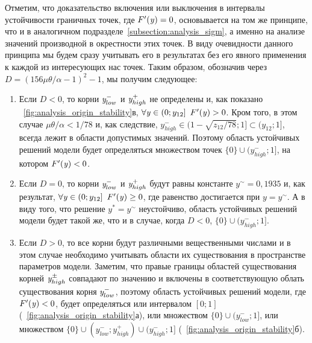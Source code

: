 Отметим, что доказательство включения или выключения в интервалы устойчивости граничных точек, где $F^{\prime}(\mathit{y}) = 0$, основывается на том же принципе, что и в аналогичном подразделе~\autoref{subsection:analysis_sigm}, а именно на анализе значений производной в окрестности этих точек. В виду очевидности данного принципа мы будем сразу учитывать его в результатах без его явного применения к каждой из интересующих нас точек. Таким образом, обозначив через $D = \left( 156 \mu \theta / \alpha - 1\right)^{2} - 1$, мы получим следующее:
\begin{enumerate}[wide]
    \item Если $D < 0$, то корни $\mathit{y}^{-}_{low}$ и $\mathit{y}^{+}_{high}$ не определены и, как показано \onfigure~\ref{fig:analysis_origin_stability}в, $\forall\scalar{y} \in \left(0; y_{12}\right]\ F^{\prime}(\scalar{y}) > 0$. Кром того, в этом случае $\mu \theta / \alpha < 1 / 78$ и, как следствие, $y_{high}^{-} \in (1 - \sqrt{z_{12} / 78}; 1] \subset (y_{12}; 1]$, \ie всегда лежит в области допустимых значений. Поэтому область устойчивых решений модели будет определяться множеством точек $\{0\} \cup (y_{high}^{-}; 1]$, на котором $F^{\prime}(\mathit{y}) < 0$.
    \item Если $D = 0$, то корни $\mathit{y}^{-}_{low}$ и $\mathit{y}^{+}_{high}$ будут равны константе $y^{\sim} = 0,1935$ и, как результат, $\forall\mathit{y} \in \left(0; y_{12}\right]\ F^{\prime}(\mathit{y}) \ge 0$, где равенство достигается при $y = y^{\sim}$. А в виду того, что решение $y^{*} = y^{\sim}$ неустойчиво, область устойчивых решений модели будет такой же, что и в случае, когда $D < 0$, \ie $\{0\} \cup (y_{high}^{-}; 1]$.
    \item Если $D > 0$, то все корни будут различными вещественными числами и в этом случае необходимо учитывать области их существования в пространстве параметров модели. Заметим, что правые границы областей существования корней $\mathit{y}^{\pm}_{high}$ совпадают по значению и включены в соответствующую облать существования корня $\mathit{y}^{-}_{low}$, поэтому область устойчивых решений модели, где $F^{\prime}(\mathit{y}) < 0$, будет определяться или интервалом $[0; 1]$ (\seefigure~\ref{fig:analysis_origin_stability}а), или множеством $\{0\} \cup (y_{low}^{-}; 1]$, или множеством $\{0\} \cup (y_{low}^{-}; y_{high}^{+}) \cup (y_{high}^{-}; 1]$ (\seefigure~\ref{fig:analysis_origin_stability}б).
\end{enumerate}



